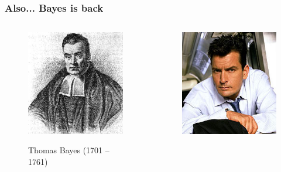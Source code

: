\documentclass{beamer}
\begin{document}
	\begin{frame}
		\frametitle{Also... Bayes is back}
		\begin{columns}
			\begin{column}{0.4\textwidth}
				\begin{figure}
					\includegraphics[scale=0.53]{bayes.jpg}
					\begin{centering}
						{\small Thomas Bayes (1701 -- 1761)} 
					\end{centering}
				\end{figure}
			\end{column}	
			\begin{column}{0.6\textwidth}
				\begin{figure}
					\includegraphics[scale=2.4]{newbayes.jpg}
				\end{figure}
			\end{column}	
\end{columns}

	\end{frame}
\end{document}
